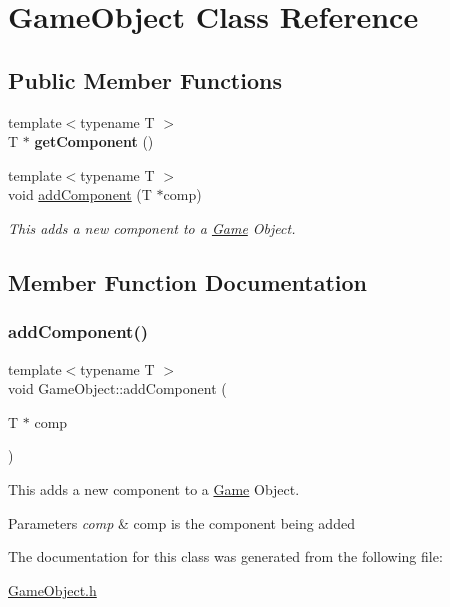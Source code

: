 \hypertarget{class_game_object}{}\section{Game\+Object Class Reference}
\label{class_game_object}
\subsection*{Public Member Functions}
\begin{DoxyCompactItemize}
\item 
\mbox{\label{class_game_object_a1c50376c7f24439359a3962f57dfd513}} 
{\footnotesize template$<$typename T $>$ }\\T $\ast$ {\bfseries get\+Component} ()
\item 
{\footnotesize template$<$typename T $>$ }\\void \mbox{\hyperlink{class_game_object_aff400b6c6e3c6af0b42fe49adb786174}{add\+Component}} (T $\ast$comp)
\begin{DoxyCompactList}\small\item\em This adds a new component to a \mbox{\hyperlink{class_game}{Game}} Object. \end{DoxyCompactList}\end{DoxyCompactItemize}


\subsection{Member Function Documentation}
\mbox{\label{class_game_object_aff400b6c6e3c6af0b42fe49adb786174}} 
\subsubsection{\texorpdfstring{addComponent()}{addComponent()}}
{\footnotesize\ttfamily template$<$typename T $>$ \\
void Game\+Object\+::add\+Component (\begin{DoxyParamCaption}\item[{T $\ast$}]{comp }\end{DoxyParamCaption})\hspace{0.3cm}{\ttfamily [inline]}}



This adds a new component to a \mbox{\hyperlink{class_game}{Game}} Object. 


\begin{DoxyParams}{Parameters}
{\em comp} & comp is the component being added \\
\hline
\end{DoxyParams}


The documentation for this class was generated from the following file\+:\begin{DoxyCompactItemize}
\item 
\mbox{\hyperlink{_game_object_8h}{Game\+Object.\+h}}\end{DoxyCompactItemize}
